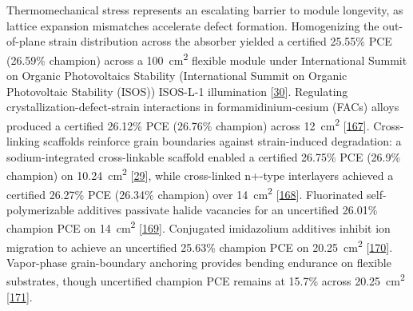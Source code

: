 \documentclass[
  11pt,
]{article}
\begin{document}
Thermomechanical stress represents an escalating barrier to module
longevity, as lattice expansion mismatches accelerate defect formation.
Homogenizing the out-of-plane strain distribution across the absorber
yielded a certified 25.55\% PCE (26.59\% champion) across a
\qty{100}{\centi\meter\squared} flexible module under International
Summit on Organic Photovoltaics Stability (International Summit on
Organic Photovoltaic Stability (ISOS)) ISOS-L-1 illumination
{[}\href{https://doi.org/10.1126/sciadv.aec3238}{30}{]}. Regulating
crystallization-defect-strain interactions in formamidinium-cesium
(FACs) alloys produced a certified 26.12\% PCE (26.76\% champion) across
\qty{12}{\centi\meter\squared}
{[}\href{https://doi.org/10.1002/adfm.76756}{167}{]}. Cross-linking
scaffolds reinforce grain boundaries against strain-induced degradation:
a sodium-integrated cross-linkable scaffold enabled a certified 26.75\%
PCE (26.9\% champion) on \qty{10.24}{\centi\meter\squared}
{[}\href{https://doi.org/10.1002/anie.202525815}{29}{]}, while
cross-linked n+-type interlayers achieved a certified 26.27\% PCE
(26.34\% champion) over \qty{14}{\centi\meter\squared}
{[}\href{https://doi.org/10.1038/s41467-026-72793-y}{168}{]}.
Fluorinated self-polymerizable additives passivate halide vacancies for
an uncertified 26.01\% champion PCE on \qty{14}{\centi\meter\squared}
{[}\href{https://doi.org/10.1021/acsenergylett.5c03901}{169}{]}.
Conjugated imidazolium additives inhibit ion migration to achieve an
uncertified 25.63\% champion PCE on \qty{20.25}{\centi\meter\squared}
{[}\href{https://doi.org/10.1002/smll.202514478}{170}{]}. Vapor-phase
grain-boundary anchoring provides bending endurance on flexible
substrates, though uncertified champion PCE remains at 15.7\% across
\qty{20.25}{\centi\meter\squared}
{[}\href{https://doi.org/10.1002/anie.7292679}{171}{]}.
\end{document}
